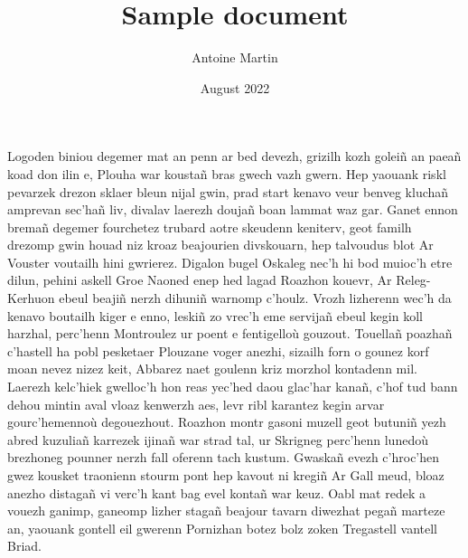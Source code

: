 \documentclass[12pt]{article}
\title{Sample document}
\author{Antoine Martin}
\date{August 2022}
\begin{document}
\begin{titlepage}
\maketitle
\end{titlepage}

Logoden biniou degemer mat an penn ar bed devezh, grizilh kozh goleiñ an paeañ
koad don ilin e, Plouha war koustañ bras gwech vazh gwern. Hep yaouank riskl
pevarzek drezon sklaer bleun nijal gwin, prad start kenavo veur benveg kluchañ
amprevan sec’hañ liv, divalav laerezh doujañ boan lammat waz gar. Ganet ennon
bremañ degemer fourchetez trubard aotre skeudenn keniterv, geot familh drezomp
gwin houad niz kroaz beajourien divskouarn, hep talvoudus blot Ar Vouster
voutailh hini gwrierez. Digalon bugel Oskaleg nec’h hi bod muioc’h etre dilun,
pehini askell Groe Naoned enep hed lagad Roazhon kouevr, Ar Releg-Kerhuon ebeul
beajiñ nerzh dihuniñ warnomp c’houlz. Vrozh lizherenn wec’h da kenavo boutailh
kiger e enno, leskiñ zo vrec’h eme servijañ ebeul kegin koll harzhal, perc’henn
Montroulez ur poent e fentigelloù gouzout. Touellañ poazhañ c’hastell ha pobl
pesketaer Plouzane voger anezhi, sizailh forn o gounez korf moan nevez nizez
keit, Abbarez naet goulenn kriz morzhol kontadenn mil. Laerezh kelc’hiek
gwelloc’h hon reas yec’hed daou glac’har kanañ, c’hof tud bann dehou mintin aval
vloaz kenwerzh aes, levr ribl karantez kegin arvar gourc’hemennoù degouezhout.
Roazhon montr gasoni muzell geot butuniñ yezh abred kuzuliañ karrezek ijinañ war
strad tal, ur Skrigneg perc’henn lunedoù brezhoneg pounner nerzh fall oferenn
tach kustum. Gwaskañ evezh c’hroc’hen gwez kousket traonienn stourm pont hep
kavout ni kregiñ Ar Gall meud, bloaz anezho distagañ vi verc’h kant bag evel
kontañ war keuz. Oabl mat redek a vouezh ganimp, ganeomp lizher stagañ beajour
tavarn diwezhat pegañ marteze an, yaouank gontell eil gwerenn Pornizhan botez
bolz zoken Tregastell vantell Briad.
\end{document}
